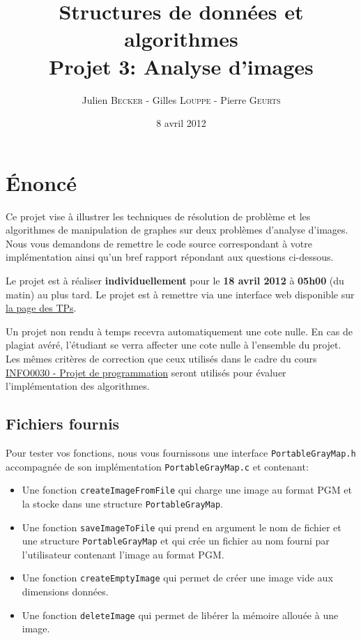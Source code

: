 \documentclass[a4paper,10pt]{article}
\title{
    \textbf{Structures de données et algorithmes}\\
    Projet 3: Analyse d'images
}
\author{Julien \textsc{Becker} - Gilles \textsc{Louppe} - Pierre \textsc{Geurts}}
\date{8 avril 2012}
\begin{document}
\maketitle

\section*{\'Enoncé}

Ce projet vise à illustrer les techniques de résolution de problème et
les algorithmes de manipulation de graphes sur deux problèmes
d'analyse d'images. Nous vous demandons de remettre le code source
correspondant à votre implémentation ainsi qu'un bref rapport
répondant aux questions ci-dessous.

Le projet est à réaliser {\bf individuellement} pour le {\bf 18 avril
  2012} à {\bf 05h00} (du matin) au plus tard. Le projet est à
remettre via une interface web disponible sur
\href{http://www.montefiore.ulg.ac.be/~glouppe/2011-2012/students.info0902.php}{la
  page des TPs}.

Un projet non rendu à temps recevra automatiquement une cote nulle. En
cas de plagiat avéré, l'étudiant se verra affecter une cote nulle à
l'ensemble du projet. Les mêmes critères de correction que ceux
utilisés dans le cadre du cours
\href{http://www.montefiore.ulg.ac.be/~info0030/}{INFO0030 - Projet de
  programmation} seront utilisés pour évaluer l'implémentation des
algorithmes.

\subsection*{Fichiers fournis}

Pour tester vos fonctions, nous vous fournissons une interface \texttt{PortableGrayMap.h} accompagnée de son implémentation \texttt{PortableGrayMap.c} et contenant:
\begin{itemize}
\item Une fonction \texttt{createImageFromFile} qui charge une image au format PGM et la stocke dans une structure \texttt{PortableGrayMap}.
\item Une fonction \texttt{saveImageToFile} qui prend en argument le nom de fichier et une structure \texttt{PortableGrayMap} et qui crée un fichier au nom fourni par l'utilisateur contenant l'image au format PGM.
\item Une fonction \texttt{createEmptyImage} qui permet de créer une image vide aux dimensions données.
\item Une fonction \texttt{deleteImage} qui permet de libérer la mémoire allouée à une image.
\end{itemize}
\end{document}
